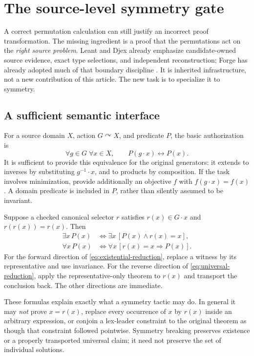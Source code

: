 \section{The source-level symmetry gate}
\label{sec:gate}
A correct permutation calculation can still justify an incorrect proof transformation. The missing ingredient is a proof that the permutations act on the \emph{right source problem}. Leant and Djex already emphasize candidate-owned source evidence, exact type selections, and independent reconstruction; Forge has already adopted much of that boundary discipline \cite{leant,djex,forge-neighbors}. It is inherited infrastructure, not a new contribution of this article. The new task is to specialize it to symmetry.

\subsection{A sufficient semantic interface}
For a source domain $X$, action $G\curvearrowright X$, and predicate $P$, the basic authorization is
\begin{equation}
 \forall g\in G\;\forall x\in X,\qquad P(g\cdot x)\leftrightarrow P(x).
 \label{eq:source-invariance}
\end{equation}
It is sufficient to provide this equivalence for the original generators: it extends to inverses by substituting $g^{-1}\cdot x$, and to products by composition. If the task involves minimization, provide additionally an objective $f$ with $f(g\cdot x)=f(x)$. A domain predicate is included in $P$, rather than silently assumed to be invariant.

Suppose a checked canonical selector $r$ satisfies $r(x)\in G\cdot x$ and $r(r(x))=r(x)$. Then
\begin{align}
 \exists x\,P(x)
 &\iff \exists x\,[P(x)\land r(x)=x],\label{eq:existential-reduction}\\
 \forall x\,P(x)
 &\iff \forall x\,[r(x)=x\Rightarrow P(x)].\label{eq:universal-reduction}
\end{align}
For the forward direction of \eqref{eq:existential-reduction}, replace a witness by its representative and use invariance. For the reverse direction of \eqref{eq:universal-reduction}, apply the representative-only theorem to $r(x)$ and transport the conclusion back. The other directions are immediate.

These formulas explain exactly what a symmetry tactic may do. In general it may \emph{not} prove $x=r(x)$, replace every occurrence of $x$ by $r(x)$ inside an arbitrary expression, or conjoin a lex-leader constraint to the original theorem as though that constraint followed pointwise. Symmetry breaking preserves existence or a properly transported universal claim; it need not preserve the set of individual solutions.

